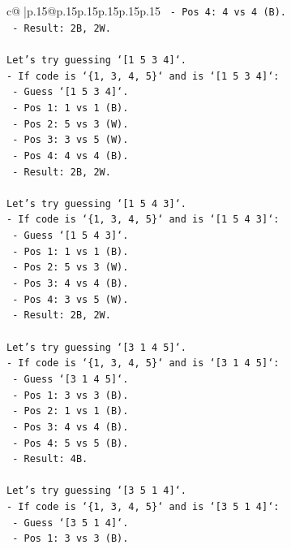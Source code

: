 \documentclass{article}
\begin{document}
{\begin{supertabular}{c@{$\;$}|p{.15\linewidth}@{}p{.15\linewidth}p{.15\linewidth}p{.15\linewidth}p{.15\linewidth}p{.15\linewidth}}
{{{\texttt{  {-} Pos 4: 4 vs 4 (B).} \\
\texttt{  {-} Result: 2B, 2W.} \\
\\ 
\texttt{Let's try guessing `{[}1 5 3 4{]}`.} \\
\texttt{{-} If code is `\{1, 3, 4, 5\}` and is `{[}1 5 3 4{]}`:} \\
\texttt{  {-} Guess `{[}1 5 3 4{]}`.} \\
\texttt{  {-} Pos 1: 1 vs 1 (B).} \\
\texttt{  {-} Pos 2: 5 vs 3 (W).} \\
\texttt{  {-} Pos 3: 3 vs 5 (W).} \\
\texttt{  {-} Pos 4: 4 vs 4 (B).} \\
\texttt{  {-} Result: 2B, 2W.} \\
\\ 
\texttt{Let's try guessing `{[}1 5 4 3{]}`.} \\
\texttt{{-} If code is `\{1, 3, 4, 5\}` and is `{[}1 5 4 3{]}`:} \\
\texttt{  {-} Guess `{[}1 5 4 3{]}`.} \\
\texttt{  {-} Pos 1: 1 vs 1 (B).} \\
\texttt{  {-} Pos 2: 5 vs 3 (W).} \\
\texttt{  {-} Pos 3: 4 vs 4 (B).} \\
\texttt{  {-} Pos 4: 3 vs 5 (W).} \\
\texttt{  {-} Result: 2B, 2W.} \\
\\ 
\texttt{Let's try guessing `{[}3 1 4 5{]}`.} \\
\texttt{{-} If code is `\{1, 3, 4, 5\}` and is `{[}3 1 4 5{]}`:} \\
\texttt{  {-} Guess `{[}3 1 4 5{]}`.} \\
\texttt{  {-} Pos 1: 3 vs 3 (B).} \\
\texttt{  {-} Pos 2: 1 vs 1 (B).} \\
\texttt{  {-} Pos 3: 4 vs 4 (B).} \\
\texttt{  {-} Pos 4: 5 vs 5 (B).} \\
\texttt{  {-} Result: 4B.} \\
\\ 
\texttt{Let's try guessing `{[}3 5 1 4{]}`.} \\
\texttt{{-} If code is `\{1, 3, 4, 5\}` and is `{[}3 5 1 4{]}`:} \\
\texttt{  {-} Guess `{[}3 5 1 4{]}`.} \\
\texttt{  {-} Pos 1: 3 vs 3 (B).} \\
}}}
\end{supertabular}}
\end{document}
